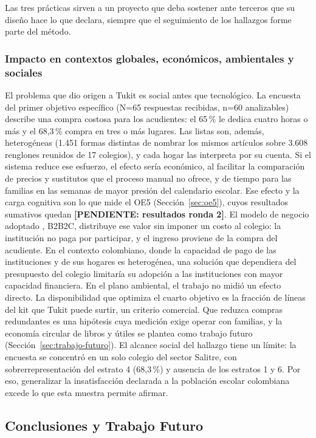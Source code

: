 Las tres prácticas sirven a un proyecto que deba sostener ante terceros que su diseño hace lo que declara, siempre que el seguimiento de los hallazgos forme parte del método.

\subsubsection{Impacto en contextos globales, económicos, ambientales y sociales}

El problema que dio origen a Tukit es social antes que tecnológico. La encuesta del primer
objetivo específico (N=65 respuestas recibidas, n=60 analizables) describe una compra
costosa para los acudientes: el 65\,\% le dedica cuatro horas o más y el 68,3\,\% compra en
tres o más lugares. Las listas son, además, heterogéneas (1.451 formas distintas de nombrar
los mismos artículos sobre 3.608 renglones reunidos de 17 colegios), y cada hogar las
interpreta por su cuenta. Si el sistema reduce ese esfuerzo, el efecto sería económico, al
facilitar la comparación de precios y sustitutos que el proceso manual no ofrece, y de tiempo
para las familias en las semanas de mayor presión del calendario escolar. Ese efecto y la carga
cognitiva son lo que mide el OE5 (Sección~\ref{sec:oe5}), cuyos resultados sumativos quedan
\textbf{[PENDIENTE: resultados ronda 2]}. El modelo de negocio adoptado
\citep{osterwalder_business_2010}, B2B2C, distribuye ese valor sin imponer un costo al colegio:
la institución no paga por participar, y el ingreso proviene de la compra del acudiente. En el
contexto colombiano, donde la capacidad de pago de las instituciones y de sus hogares es
heterogénea, una solución que dependiera del presupuesto del colegio limitaría su adopción a
las instituciones con mayor capacidad financiera. En el plano ambiental, el trabajo no midió un efecto directo. La disponibilidad que optimiza el
cuarto objetivo es la fracción de líneas del kit que Tukit puede surtir, un criterio comercial. Que
reduzca compras redundantes es una hipótesis cuya medición exige operar con familias, y la economía
circular de libros y útiles se plantea como trabajo futuro (Sección~\ref{sec:trabajo-futuro}). El alcance social del hallazgo tiene un límite: la encuesta se
concentró en un solo colegio del sector Salitre, con sobrerrepresentación del estrato 4
(68,3\,\%) y ausencia de los estratos 1 y 6. Por eso, generalizar la insatisfacción declarada a
la población escolar colombiana excede lo que esta muestra permite afirmar.

\subsection{Conclusiones y Trabajo Futuro}

